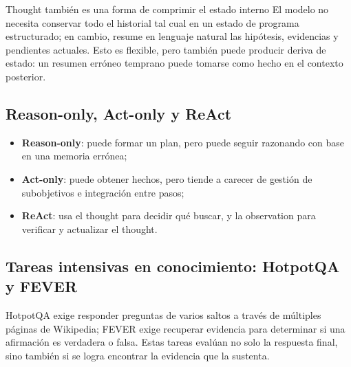 
\begin{knowledgebox}{Thought también es una forma de comprimir el estado interno}
El modelo no necesita conservar todo el historial tal cual en un estado de programa estructurado; en cambio, resume en lenguaje natural las hipótesis, evidencias y pendientes actuales. Esto es flexible, pero también puede producir deriva de estado: un resumen erróneo temprano puede tomarse como hecho en el contexto posterior.
\end{knowledgebox}

\subsection{Reason-only, Act-only y ReAct}


\begin{itemize}
    \item \textbf{Reason-only}: puede formar un plan, pero puede seguir razonando con base en una memoria errónea;
    \item \textbf{Act-only}: puede obtener hechos, pero tiende a carecer de gestión de subobjetivos e integración entre pasos;
    \item \textbf{ReAct}: usa el thought para decidir qué buscar, y la observation para verificar y actualizar el thought.
\end{itemize}

\subsection{Tareas intensivas en conocimiento: HotpotQA y FEVER}

HotpotQA exige responder preguntas de varios saltos a través de múltiples páginas de Wikipedia; FEVER exige recuperar evidencia para determinar si una afirmación es verdadera o falsa. Estas tareas evalúan no solo la respuesta final, sino también si se logra encontrar la evidencia que la sustenta.


